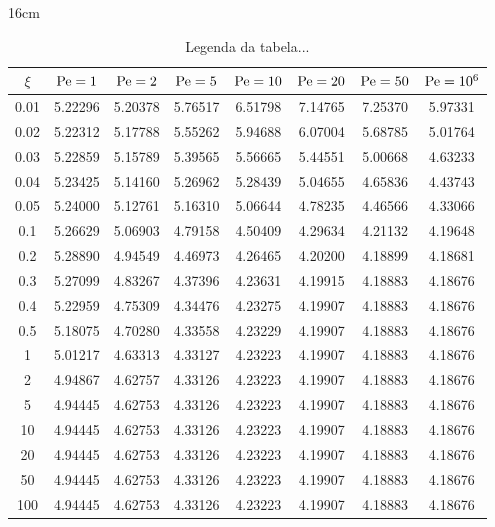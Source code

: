 \begin{table}[h!]{16cm}
	\caption{Legenda da tabela... \label{tab1}}
	\centering
	\renewcommand\arraystretch{1.0}
	\begin{tabular}{|c | c|c|c|c|c|c|c|}
		\hline
		$\xi$ & $\mathrm{Pe}=1$ & $\mathrm{Pe}=2$ & $\mathrm{Pe}=5$ & $\mathrm{Pe}=10$ & $\mathrm{Pe}=20$ & $\mathrm{Pe}=50$ & $\mathrm{Pe}=10^6$  \\
		\hline
		0.01 & 5.22296 & 5.20378 & 5.76517 & 6.51798 & 7.14765 & 7.25370 & 5.97331 \\
		0.02 & 5.22312 & 5.17788 & 5.55262 & 5.94688 & 6.07004 & 5.68785 & 5.01764 \\
		0.03 & 5.22859 & 5.15789 & 5.39565 & 5.56665 & 5.44551 & 5.00668 & 4.63233 \\
		0.04 & 5.23425 & 5.14160 & 5.26962 & 5.28439 & 5.04655 & 4.65836 & 4.43743 \\
		0.05 & 5.24000 & 5.12761 & 5.16310 & 5.06644 & 4.78235 & 4.46566 & 4.33066 \\
		0.1 & 5.26629 & 5.06903 & 4.79158 & 4.50409 & 4.29634 & 4.21132 & 4.19648 \\
		0.2 & 5.28890 & 4.94549 & 4.46973 & 4.26465 & 4.20200 & 4.18899 & 4.18681 \\
		0.3 & 5.27099 & 4.83267 & 4.37396 & 4.23631 & 4.19915 & 4.18883 & 4.18676 \\
		0.4 & 5.22959 & 4.75309 & 4.34476 & 4.23275 & 4.19907 & 4.18883 & 4.18676 \\
		0.5 & 5.18075 & 4.70280 & 4.33558 & 4.23229 & 4.19907 & 4.18883 & 4.18676 \\
		1 & 5.01217 & 4.63313 & 4.33127 & 4.23223 & 4.19907 & 4.18883 & 4.18676 \\
		2 & 4.94867 & 4.62757 & 4.33126 & 4.23223 & 4.19907 & 4.18883 & 4.18676 \\
		5 & 4.94445 & 4.62753 & 4.33126 & 4.23223 & 4.19907 & 4.18883 & 4.18676 \\
		10 & 4.94445 & 4.62753 & 4.33126 & 4.23223 & 4.19907 & 4.18883 & 4.18676 \\
		20 & 4.94445 & 4.62753 & 4.33126 & 4.23223 & 4.19907 & 4.18883 & 4.18676 \\
		50 & 4.94445 & 4.62753 & 4.33126 & 4.23223 & 4.19907 & 4.18883 & 4.18676 \\
		100 & 4.94445 & 4.62753 & 4.33126 & 4.23223 & 4.19907 & 4.18883 & 4.18676 \\
		\hline 
	\end{tabular}
\end{table}



